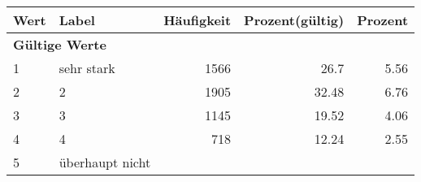      \begin{longtable}{lXrrr}
     \toprule
     \textbf{Wert} & \textbf{Label} & \textbf{Häufigkeit} & \textbf{Prozent(gültig)} & \textbf{Prozent} \\
     \endhead
     \midrule
     \multicolumn{5}{l}{\textbf{Gültige Werte}}\\

     1 &
     \multicolumn{1}{X}{ sehr stark   } &


       \num{1566} &
       \num[round-mode=places,round-precision=2]{26.7} &
         \num[round-mode=places,round-precision=2]{5.56} \\

     2 &
     \multicolumn{1}{X}{ 2   } &


       \num{1905} &
       \num[round-mode=places,round-precision=2]{32.48} &
         \num[round-mode=places,round-precision=2]{6.76} \\

     3 &
     \multicolumn{1}{X}{ 3   } &


       \num{1145} &
       \num[round-mode=places,round-precision=2]{19.52} &
         \num[round-mode=places,round-precision=2]{4.06} \\

     4 &
     \multicolumn{1}{X}{ 4   } &


       \num{718} &
       \num[round-mode=places,round-precision=2]{12.24} &
         \num[round-mode=places,round-precision=2]{2.55} \\

     5 &
     \multicolumn{1}{X}{ überhaupt nicht   } &



\end{longtable}
